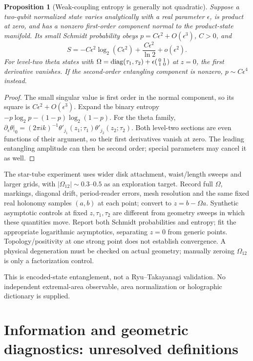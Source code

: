 \documentclass[11pt]{article}
\newtheorem{proposition}[theorem]{Proposition}
\theoremstyle{definition}
\theoremstyle{remark}
\begin{document}
\begin{proposition}[Weak-coupling entropy is generally not quadratic]\label{prop:entropy-asymptotic}
Suppose a two-qubit normalized state varies analytically with a real
parameter $\epsilon$, is product at zero, and has a nonzero first-order
component normal to the product-state manifold. Its small Schmidt
probability obeys $p=C\epsilon^2+O(\epsilon^3)$, $C>0$, and
\[
 S=-C\epsilon^2\log_2(C\epsilon^2)
       +\frac{C\epsilon^2}{\ln2}+o(\epsilon^2).
\]
For level-two theta states with
$\Omega=\operatorname{diag}(\tau_1,\tau_2)
+\epsilon\begin{psmallmatrix}0&1\\1&0\end{psmallmatrix}$
at $z=0$, the first derivative vanishes. If the second-order entangling
component is nonzero, $p\sim C\epsilon^4$ instead.
\end{proposition}
\begin{proof}
The small singular value is first order in the normal component, so its
square is $C\epsilon^2+O(\epsilon^3)$. Expand the binary entropy
$-p\log_2p-(1-p)\log_2(1-p)$.
For the theta family,
$\partial_\epsilon\theta|_0=(2\pi i k)^{-1}
\theta'_{j_1}(z_1;\tau_1)\theta'_{j_2}(z_2;\tau_2)$.
Both level-two sections are even functions of their argument, so their
first derivatives vanish at zero. The leading entangling amplitude can
then be second order; special parameters may cancel it as well.
\end{proof}

The star-tube experiment uses wider disk attachment, waist/length sweeps
and larger grids, with $|\Omega_{12}|\sim0.3$--$0.5$ as an exploration
target. Record full $\Omega$, markings,
diagonal drift, period-reader errors, mesh resolution and the same fixed
real holonomy samples $(a,b)$ at each point; convert to $z=b-\Omega a$.
Synthetic asymptotic controls at fixed $z,\tau_1,\tau_2$ are different
from geometry sweeps in which these quantities move. Report both Schmidt
probabilities and entropy; fit the appropriate logarithmic asymptotics,
separating $z=0$ from generic points.
Topology/positivity at one strong point does not establish convergence.
A physical degeneration must be checked on actual geometry; manually
zeroing $\Omega_{12}$ is only a factorization control.

This is encoded-state entanglement, not a Ryu--Takayanagi validation.
No independent extremal-area observable, area normalization or holographic
dictionary is supplied.

\section{Information and geometric diagnostics: unresolved definitions}
\end{document}

